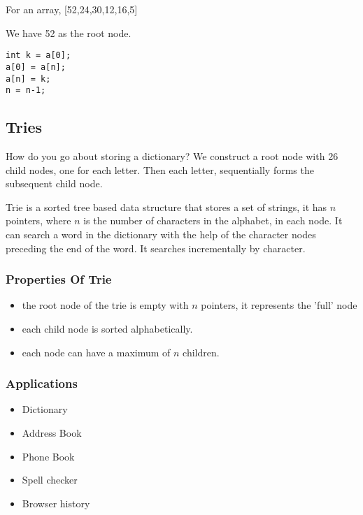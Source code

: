 \documentclass[11pt]{article}
\begin{document}
For an array, [52,24,30,12,16,5]

We have 52 as the root node.

\begin{verbatim}
int k = a[0];
a[0] = a[n];
a[n] = k;
n = n-1;

\end{verbatim}
\subsection{Tries}
\label{sec:org6fd4e2a}
How do you go about storing a dictionary? We construct a root node with 26 child nodes, one for each letter. Then each letter, sequentially forms the subsequent child node.

Trie is a sorted tree based data structure that stores a set of strings, it has \(n\) pointers, where \(n\) is the number of characters in the alphabet, in each node. It can search a word in the dictionary with the help of the character nodes preceding the end of the word. It searches incrementally by character.
\subsubsection{Properties Of Trie}
\label{sec:org353a753}
\begin{itemize}
\item the root node of the trie is empty with \(n\) pointers, it represents the 'full' node
\item each child node is sorted alphabetically.
\item each node can have a maximum of \(n\) children.
\end{itemize}
\subsubsection{Applications}
\label{sec:orgf2ea5cc}
\begin{itemize}
\item Dictionary
\item Address Book
\item Phone Book
\item Spell checker
\item Browser history
\end{itemize}
\end{document}
